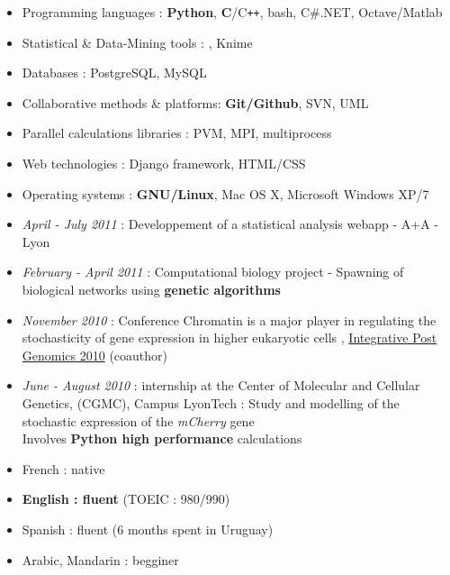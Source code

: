 
\begin{itemize}
\renewcommand{\labelitemi}{$\circ$}
    \item Programming languages : \textbf{Python}, \textbf{C}/C{\tt ++}, bash, C\#.NET, Octave/Matlab
    \item Statistical \& Data-Mining tools : \Rlogo, Knime
    \item Databases : PostgreSQL, MySQL
    \item Collaborative methods \& platforms: \textbf{Git/Github}, SVN, UML
    \item Parallel calculations libraries : PVM, MPI, multiprocess
    \item Web technologies : Django framework, HTML/CSS
    \item Operating systems : \textbf{GNU/Linux}, Mac OS X, Microsoft Windows XP/7
\end{itemize}


\begin{itemize}
\renewcommand{\labelitemi}{$\circ$}
	\item \emph{April - July 2011} : Developpement of a statistical analysis webapp - A+A - Lyon
	\item \textit{February - April 2011} : Computational biology project - Spawning of biological networks using \textbf{genetic algorithms}
    \item \textit{November 2010} : Conference \og Chromatin is a major player in regulating the stochasticity of gene expression in higher eukaryotic cells \fg{}, \href{http://ipg.insa-lyon.fr/}{Integrative Post Genomics 2010} (coauthor)
    \item \textit{June - August 2010} : internship at the Center of Molecular and Cellular Genetics, (CGMC), Campus LyonTech : \og Study and modelling of the stochastic expression of the \textit{mCherry} gene\fg{} \\Involves \textbf{Python high performance} calculations
\end{itemize}


    \begin{itemize}
    \renewcommand{\labelitemi}{$\circ$}
    \item French : native
    \item \textbf{English : fluent} (TOEIC : 980/990)
    \item Spanish : fluent (6 months spent in Uruguay) 
    \item Arabic, Mandarin : begginer
\end{itemize}
    
